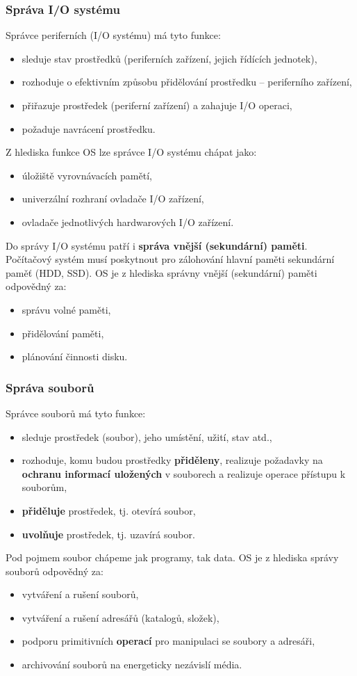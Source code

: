 \subsubsection{Správa I/O systému}
Správce periferních (I/O systému) má tyto funkce:
\begin{itemize}
	\item sleduje stav prostředků (periferních zařízení, jejich řídících jednotek),
	\item rozhoduje o efektivním způsobu přidělování prostředku -- periferního zařízení,
	\item přiřazuje prostředek (periferní zařízení) a zahajuje I/O operaci,
	\item požaduje navrácení prostředku.
\end{itemize}
Z hlediska funkce OS lze správce I/O systému chápat jako:
\begin{itemize}
	\item úložiště vyrovnávacích pamětí,
	\item univerzální rozhraní ovladače I/O zařízení,
	\item ovladače jednotlivých hardwarových I/O zařízení.
\end{itemize}
Do správy I/O systému patří i \textbf{správa vnější (sekundární) paměti}. Počítačový systém musí poskytnout pro zálohování hlavní paměti sekundární paměť (HDD, SSD). OS je z hlediska správny vnější (sekundární) paměti odpovědný za:
\begin{itemize}
	\item správu volné paměti,
	\item přidělování paměti,
	\item plánování činnosti disku.
\end{itemize}

\subsubsection{Správa souborů}
Správce souborů má tyto funkce:
\begin{itemize}
	\item sleduje prostředek (soubor), jeho umístění, užití, stav atd.,
	\item rozhoduje, komu budou prostředky \textbf{přiděleny}, realizuje požadavky na \textbf{ochranu informací uložených} v souborech a realizuje operace přístupu k souborům,
	\item \textbf{přiděluje} prostředek, tj. otevírá soubor,
	\item \textbf{uvolňuje} prostředek, tj. uzavírá soubor.
\end{itemize}
Pod pojmem soubor chápeme jak programy, tak data. OS je z hlediska správy souborů odpovědný za:
\begin{itemize}
	\item vytváření a rušení souborů,
	\item vytváření a rušení adresářů (katalogů, složek),
	\item podporu primitivních \textbf{operací} pro manipulaci se soubory a adresáři,
	\item archivování souborů na energeticky nezávislí média.
\end{itemize}
